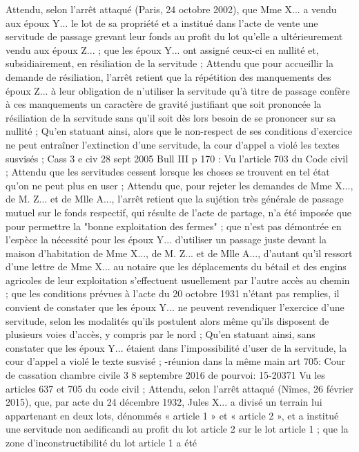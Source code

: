 \documentclass[11pt,a4paper]{report}
\begin{document}
	Attendu, selon l'arrêt attaqué (Paris, 24 octobre 2002), que Mme X... a vendu aux époux Y... le lot  de sa
	propriété et a institué dans l'acte de vente une servitude de passage grevant leur fonds au profit du lot 
	qu'elle a ultérieurement vendu aux époux Z... ;
	que les époux Y... ont assigné ceux-ci en nullité et, subsidiairement, en résiliation de la servitude ;
	Attendu que pour accueillir la demande de résiliation, l'arrêt retient que la répétition des manquements des
	époux Z... à leur obligation de n'utiliser la servitude qu'à titre de passage confère à ces manquements un
	caractère de gravité justifiant que soit prononcée la résiliation de la servitude sans qu'il soit dès lors besoin de
	se prononcer sur sa nullité ;
	Qu'en statuant ainsi, alors que le non-respect de ses conditions d'exercice ne peut entraîner l'extinction d'une
	servitude, la cour d'appel a violé les textes susvisés ;
	Cass 3 e civ 28 sept 2005 Bull III  p 170 : Vu l'article 703 du Code civil ; Attendu que les servitudes
	cessent lorsque les choses se trouvent en tel état qu'on ne peut plus en user ;
	Attendu que, pour rejeter les demandes de Mme X..., de M. Z... et de Mlle A..., l'arrêt retient que la sujétion très
	générale de passage mutuel sur le fonds respectif, qui résulte de l'acte de partage, n'a été imposée que pour
	permettre la "bonne exploitation des fermes" ;
	que n'est pas démontrée en l'espèce la nécessité pour les époux Y... d'utiliser un passage juste devant la maison
	d'habitation de Mme X..., de M. Z... et de Mlle A..., d'autant qu'il ressort d'une lettre de Mme X... au notaire que
	les déplacements du bétail et des engins agricoles de leur exploitation s'effectuent usuellement par l'autre accès
	au chemin ; que les conditions prévues à l'acte du 20 octobre 1931 n'étant pas remplies, il convient de constater
	que les époux Y... ne peuvent revendiquer l'exercice d'une servitude, selon les modalités qu'ils postulent alors
	même qu'ils disposent de plusieurs voies d'accès, y compris par le nord ; Qu'en statuant ainsi, sans constater que
	les époux Y... étaient dans l'impossibilité d'user de la servitude, la cour d'appel a violé le texte susvisé ;
	-réunion dans la même main art 705:
	Cour de cassation chambre civile 3 8 septembre 2016 \No  de pourvoi: 15-20371
	Vu les articles 637 et 705 du code civil ;
	Attendu, selon l'arrêt attaqué (Nîmes, 26 février 2015), que, par acte du 24 décembre 1932, Jules X... a divisé un
	terrain lui appartenant en deux lots, dénommés « article 1 » et « article 2 », et a institué une servitude non
	aedificandi au profit du lot article 2 sur le lot article 1 ; que la zone d'inconstructibilité du lot article 1 a été
\end{document}
